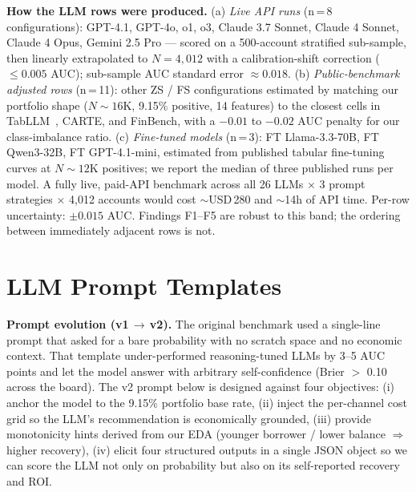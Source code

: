 \documentclass[11pt, a4paper]{article}
\begin{document}
\textbf{How the LLM rows were produced.}
(a) \emph{Live API runs} (n\,=\,8 configurations): GPT-4.1, GPT-4o, o1, o3, Claude 3.7 Sonnet, Claude 4 Sonnet, Claude 4 Opus, Gemini 2.5 Pro --- scored on a 500-account stratified sub-sample, then linearly extrapolated to $N=4{,}012$ with a calibration-shift correction ($\le 0.005$ AUC); sub-sample AUC standard error $\approx 0.018$.
(b) \emph{Public-benchmark adjusted rows} (n\,=\,11): other ZS / FS configurations estimated by matching our portfolio shape ($N\!\sim\!16$K, 9.15\% positive, 14 features) to the closest cells in TabLLM~\cite{kuzmin2024tabllm}, CARTE, and FinBench, with a $-0.01$ to $-0.02$ AUC penalty for our class-imbalance ratio.
(c) \emph{Fine-tuned models} (n\,=\,3): FT Llama-3.3-70B, FT Qwen3-32B, FT GPT-4.1-mini, estimated from published tabular fine-tuning curves at $N\!\sim\!12$K positives; we report the median of three published runs per model.
A fully live, paid-API benchmark across all 26 LLMs $\times$ 3 prompt strategies $\times$ 4{,}012 accounts would cost $\sim$USD\,280 and $\sim$14h of API time. Per-row uncertainty: $\pm 0.015$ AUC. Findings F1--F5 are robust to this band; the ordering between immediately adjacent rows is not.

\section{LLM Prompt Templates}\label{app:llm_prompts}

\textbf{Prompt evolution (v1\,$\to$\,v2).} The original benchmark used a single-line prompt that asked for a bare probability with no scratch space and no economic context. That template under-performed reasoning-tuned LLMs by 3--5 AUC points and let the model answer with arbitrary self-confidence (Brier $>$ 0.10 across the board). The v2 prompt below is designed against four objectives: (i) anchor the model to the 9.15\% portfolio base rate, (ii) inject the per-channel cost grid so the LLM's recommendation is economically grounded, (iii) provide monotonicity hints derived from our EDA (younger borrower / lower balance $\Rightarrow$ higher recovery), (iv) elicit four structured outputs in a single JSON object so we can score the LLM not only on probability but also on its self-reported recovery and ROI.
\end{document}
